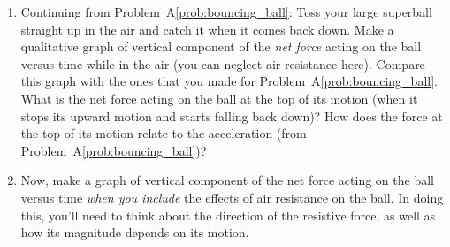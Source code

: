 \begin{exercise}
  \begin{enumerate}
  \item Continuing from Problem~A\ref{prob:bouncing_ball}: Toss your
    large superball straight up in the air and catch it when it comes
    back down.  Make a qualitative graph of vertical component of the
    \emph{net force} acting on the ball versus time while in the air
    (you can neglect air resistance here).  Compare this graph with
    the ones that you made for Problem~A\ref{prob:bouncing_ball}.
    What is the net force acting on the ball at the top of its motion
    (when it stops its upward motion and starts falling back down)?
    How does the force at the top of its motion relate to the acceleration
    (from Problem~A\ref{prob:bouncing_ball})?

  \item Now, make a graph of vertical component of the net force acting
    on the ball versus time \emph{when you include} the effects of air
    resistance on the ball.  In doing this, you'll need to think about
    the direction of the resistive force, as well as how its magnitude
    depends on its motion.
  \end{enumerate}
\end{exercise}


